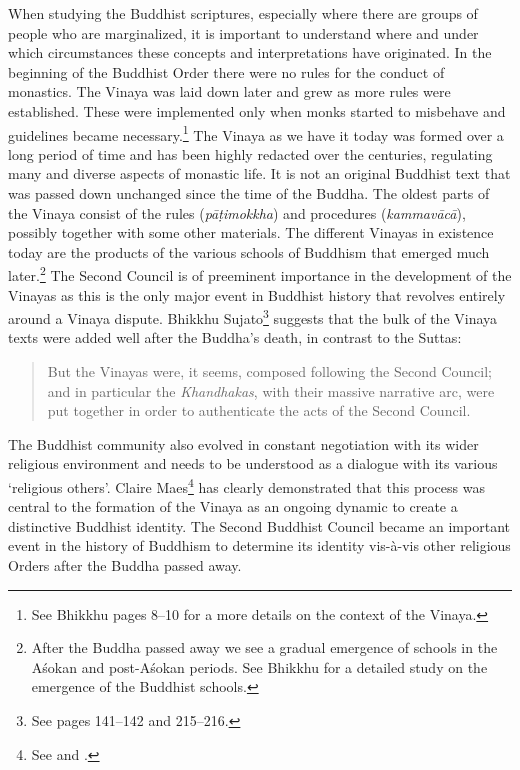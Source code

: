 When studying the Buddhist scriptures, especially where there are groups of people who are marginalized, it is important to understand where and under which circumstances these concepts and interpretations have originated.
In the beginning of the Buddhist Order there were no rules for the conduct of monastics. The Vinaya was laid down later and grew as more rules were established. These were implemented only when monks started to misbehave and guidelines became necessary.\footnote{See Bhikkhu \cite{sujato2009} pages 8–10 for a more details on the context of the Vinaya.} The Vinaya as we have it today was formed over a long period of time and has been highly redacted over the centuries, regulating many and diverse aspects of monastic life. It is not an original Buddhist text that was passed down unchanged since the time of the Buddha. The oldest parts of the Vinaya consist of the rules ({\em pāṭimokkha}) and procedures ({\em kammavācā}), possibly together with some other materials. The different Vinayas in existence today are the products of the various schools of Buddhism that emerged much later.\footnote{After the Buddha passed away we see a gradual emergence of schools in the Aśokan and post-Aśokan periods. See Bhikkhu \cite{sujato2012} for a detailed study on the emergence of the Buddhist schools.} The Second Council is of preeminent importance in the development of the Vinayas as this is the only major event in Buddhist history that revolves entirely around a Vinaya dispute. Bhikkhu Sujato\footnote{See \cite{sujato2009} pages 141–142 and 215–216.} suggests that the bulk of the Vinaya texts were added well after the Buddha's death, in contrast to the Suttas: 

\begin{quote}
But the Vinayas were, it seems, composed following the Second Council; and in particular the {\em Khandhakas}, with their massive narrative arc, were put together in order to authenticate the acts of the Second Council.
\end{quote}

The Buddhist community also evolved in constant negotiation with its wider religious environment and needs to be understood as a dialogue with its various `religious others'. Claire Maes\footnote{See \cite{maes} and \cite{maes2016}.} has clearly demonstrated that this process was central to the formation of the Vinaya as an ongoing dynamic to create a distinctive Buddhist identity. The Second Buddhist Council became an important event in the history of Buddhism to determine its identity vis-à-vis other religious Orders after the Buddha passed away.

